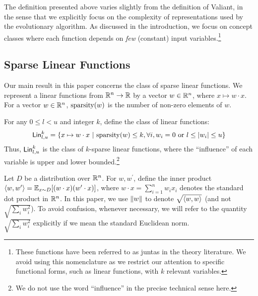 The definition presented above varies slightly from the definition of Valiant,
in the sense that we explicitly focus on the complexity of representations used
by the evolutionary algorithm. As discussed in the introduction, we focus on
concept classes where each function depends on \emph{few} (constant) input
variables.\footnote{These functions have been referred to as juntas in the
theory literature. We avoid using this nomenclature as we restrict our attention
to specific functional forms, such as linear functions, with $k$ relevant
variables.} 


\subsection{Sparse Linear Functions} 
\label{sec:notation-class}

Our main result in this paper concerns the class of sparse linear functions.  We
represent a linear functions from $\mathbb{R}^n \rightarrow \mathbb{R}$ by a vector $w
\in \mathbb{R}^n$, where $x \mapsto w \cdot x$.  For a vector $w \in \mathbb{R}^n$,
$\mathrm{sparsity}(w)$ is the number of non-zero elements of $w$.

For any $0 \leq l < u$ and integer $k$, define the class of linear functions:
\[
\mathsf{Lin}^k_{l, u} = \{ x \mapsto w \cdot x ~|~ \mathrm{sparsity}(w) \leq k, \forall i,
w_i = 0 \mbox{ or } l \leq |w_i| \leq u \}
\]
Thus, $\mathsf{Lin}^k_{l, u}$ is the class of $k$-sparse linear functions, where the
``influence'' of each variable is upper and lower bounded.\footnote{We do not
use the word ``influence'' in the precise technical sense here.}

Let $D$ be a distribution over $\mathbb{R}^n$. For $w, w^\prime$, define the inner
product $\langle w, w^\prime \rangle = \mathbb{E}_{x \sim D}[(w \cdot x) (w^\prime \cdot x)]$,
where $w \cdot x = \sum_{i = 1}^n w_i x_i$ denotes the standard dot product in
$\mathbb{R}^n$. In this paper, we use $\Vert w \Vert$ to denote $\sqrt{\langle w, w \rangle}$
(and not $\sqrt{\sum_{i} w_i^2}$). To avoid confusion, whenever necessary, we
will refer to the quantity $\sqrt{\sum_{i} w_i^2}$ explicitly if we mean the
standard Euclidean norm. 
%
%

